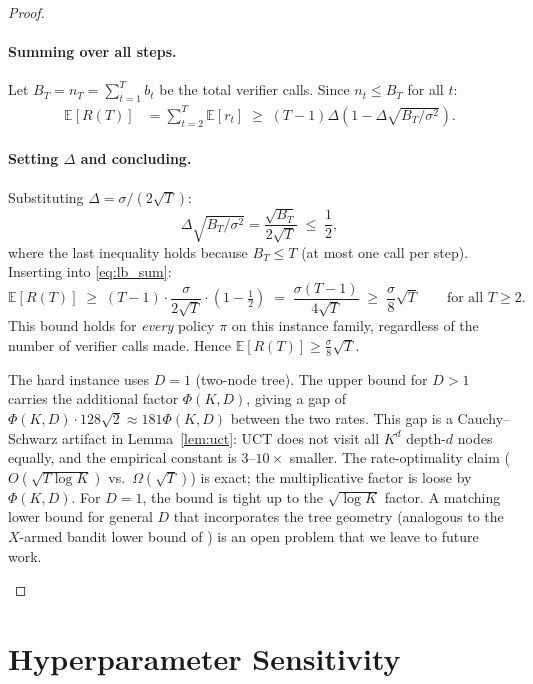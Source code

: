 \begin{proof}
\paragraph{Summing over all steps.}
Let $B_T = n_T = \sum_{t=1}^T b_t$ be the total verifier calls.
Since $n_t \leq B_T$ for all $t$:
\begin{align}
  \mathbb{E}[R(T)]
  &= \sum_{t=2}^T \mathbb{E}[r_t]
   \;\geq\; (T-1)\Delta\!\left(1 - \Delta\sqrt{B_T/\sigma^2}\right). \label{eq:lb_sum}
\end{align}

\paragraph{Setting $\Delta$ and concluding.}
Substituting $\Delta = \sigma/(2\sqrt{T})$:
\[
  \Delta\sqrt{B_T/\sigma^2} = \frac{\sqrt{B_T}}{2\sqrt{T}} \;\leq\; \frac{1}{2},
\]
where the last inequality holds because $B_T \leq T$ (at most one call per step).
Inserting into \eqref{eq:lb_sum}:
\[
  \mathbb{E}[R(T)]
  \;\geq\; (T-1) \cdot \frac{\sigma}{2\sqrt{T}} \cdot \left(1 - \tfrac{1}{2}\right)
  \;=\; \frac{\sigma(T-1)}{4\sqrt{T}}
  \;\geq\; \frac{\sigma}{8}\sqrt{T}
  \qquad\text{for all } T \geq 2.
\]
This bound holds for \emph{every} policy $\pi$ on this instance family,
regardless of the number of verifier calls made.
Hence $\mathbb{E}[R(T)] \geq \frac{\sigma}{8}\sqrt{T}$.

\begin{remark}
\label{rem:lb_scope}
The hard instance uses $D{=}1$ (two-node tree).  The upper bound for $D > 1$
carries the additional factor $\Phi(K,D)$, giving a gap of $\Phi(K,D)\cdot
128\sqrt{2} \approx 181\Phi(K,D)$ between the two rates.  This gap is a
Cauchy--Schwarz artifact in Lemma~\ref{lem:uct}: UCT does not visit all $K^d$
depth-$d$ nodes equally, and the empirical constant is $3$--$10\times$ smaller.
The rate-optimality claim ($O(\sqrt{T\log K})$ vs.\ $\Omega(\sqrt{T})$)
is exact; the multiplicative factor is loose by $\Phi(K,D)$.
For $D{=}1$, the bound is tight up to the $\sqrt{\log K}$ factor.
A matching lower bound for general $D$ that incorporates the tree geometry
(analogous to the $X$-armed bandit lower bound of \citet{bubeck2011x})
is an open problem that we leave to future work.
\end{remark}

\end{proof}

\section{Hyperparameter Sensitivity}
\label{app:hyperparams}

